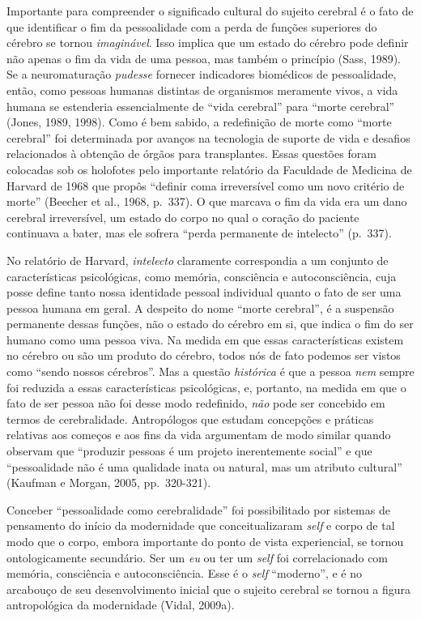 Importante para compreender o significado cultural do sujeito cerebral é
o fato de que identificar o fim da pessoalidade com a perda de funções
superiores do cérebro se tornou \emph{imaginável}. Isso implica que um
estado do cérebro pode definir não apenas o fim da vida de uma pessoa,
mas também o princípio (Sass, 1989). Se a neuromaturação \emph{pudesse}
fornecer indicadores biomédicos de pessoalidade, então, como pessoas
humanas distintas de organismos meramente vivos, a vida humana se
estenderia essencialmente de ``vida cerebral'' para ``morte cerebral''
(Jones, 1989, 1998). Como é bem sabido, a redefinição de morte como
``morte cerebral'' foi determinada por avanços na tecnologia de suporte
de vida e desafios relacionados à obtenção de órgãos para transplantes.
Essas questões foram colocadas sob os holofotes pelo importante
relatório da Faculdade de Medicina de Harvard de 1968 que propôs
``definir coma irreversível como um novo critério de morte'' (Beecher et
al., 1968, p.~337). O que marcava o fim da vida era um dano cerebral
irreversível, um estado do corpo no qual o coração do paciente
continuava a bater, mas ele sofrera ``perda permanente de intelecto''
(p.~337).

No relatório de Harvard, \emph{intelecto} claramente correspondia a um
conjunto de características psicológicas, como memória, consciência e
autoconsciência, cuja posse define tanto nossa identidade pessoal
individual quanto o fato de ser uma pessoa humana em geral. A despeito do nome
``morte cerebral'', é a suspensão permanente dessas funções, não o
estado do cérebro em si, que indica o fim do ser humano como uma pessoa
viva. Na medida em que essas características existem no cérebro ou são um
produto do cérebro, todos nós de fato podemos ser vistos como ``sendo
nossos cérebros''. Mas a questão \emph{histórica} é que a pessoa
\emph{nem} sempre foi reduzida a essas características psicológicas, e,
portanto, na medida em que o fato de ser pessoa não foi desse modo redefinido,
\emph{não} pode ser concebido em termos de cerebralidade. Antropólogos
que estudam concepções e práticas relativas aos começos e aos fins da
vida argumentam de modo similar quando observam que ``produzir pessoas é
um projeto inerentemente social'' e que ``pessoalidade não é uma
qualidade inata ou natural, mas um atributo cultural'' (Kaufman e
Morgan, 2005, pp.~320-321).

Conceber ``pessoalidade como cerebralidade'' foi possibilitado por
sistemas de pensamento do início da modernidade que conceitualizaram
\emph{self} e corpo de tal modo que o corpo, embora importante do ponto de vista
experiencial, se tornou ontologicamente secundário. Ser um \emph{eu} ou
ter um \emph{self} foi correlacionado com memória, consciência e
autoconsciência. Esse é o \emph{self} ``moderno'', e é no arcabouço de seu
desenvolvimento inicial que o sujeito cerebral se tornou a figura
antropológica da modernidade (Vidal, 2009a).

